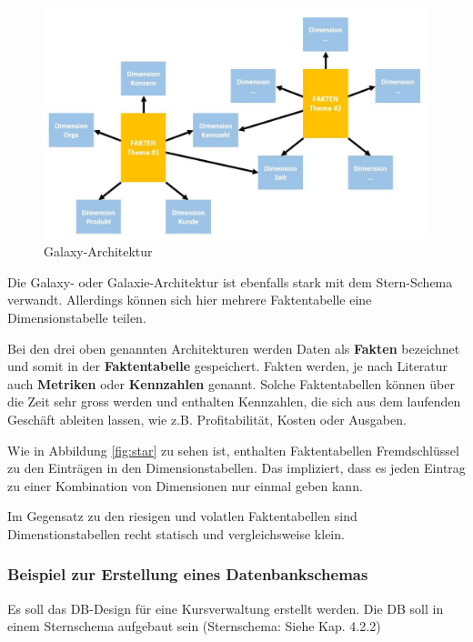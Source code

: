 \documentclass[a4paper, 11pt, nofootinbib]{article}
\begin{document}
\begin{figure}
	\centering
	\includegraphics[keepaspectratio=true,height=15\baselineskip]{galaxy.PNG}
	\caption{Galaxy-Architektur}
	\label{fig:galaxy}
\end{figure}

Die Galaxy- oder Galaxie-Architektur ist ebenfalls stark mit dem Stern-Schema verwandt. Allerdings können sich hier mehrere Faktentabelle eine Dimensionstabelle teilen.

\vspace{20px}

\noindent Bei den drei oben genannten Architekturen werden Daten als \textbf{Fakten} bezeichnet und somit in der \textbf{Faktentabelle} gespeichert. Fakten werden, je nach Literatur auch \textbf{Metriken} oder \textbf{Kennzahlen} genannt. Solche Faktentabellen können über die Zeit sehr gross werden und enthalten Kennzahlen, die sich aus dem laufenden Geschäft ableiten lassen, wie z.B. Profitabilität, Kosten oder Ausgaben.

Wie in Abbildung \ref{fig:star} zu sehen ist, enthalten Faktentabellen Fremdschlüssel zu den Einträgen in den Dimensionstabellen. Das impliziert, dass es jeden Eintrag zu einer Kombination von Dimensionen nur einmal geben kann.

Im Gegensatz zu den riesigen und volatlen Faktentabellen sind Dimenstionstabellen recht statisch und vergleichsweise klein. 

\subsubsection{Beispiel zur Erstellung eines Datenbankschemas}
Es soll das DB-Design für eine Kursverwaltung erstellt werden. Die DB soll in einem Sternschema aufgebaut sein (Sternschema: Siehe Kap. 4.2.2)
\end{document}
